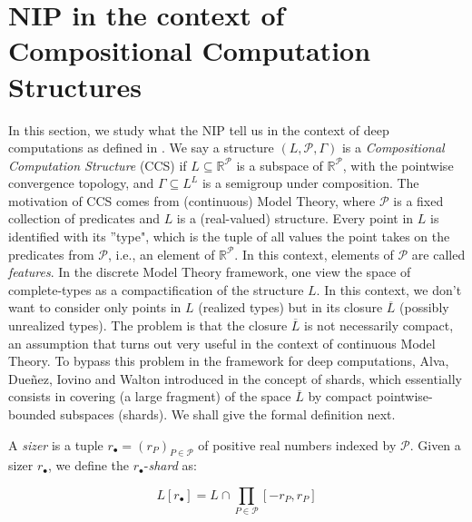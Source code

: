\documentclass[psamsfonts]{amsart}
\theoremstyle{definition}
\theoremstyle{remark}
\numberwithin{equation}{section}
\begin{document}
\section{NIP in the context of Compositional Computation Structures}

In this section, we study what the NIP tell us in the context of deep computations as defined in \cite{alva2024approximability}. We say a structure $(L,\mathcal P,\Gamma)$ is a \emph{Compositional Computation Structure} (CCS) if $L\subseteq\mathbb R^\mathcal P$ is a subspace of $\mathbb{R}^\mathcal{P}$, with the pointwise convergence topology, and $\Gamma\subseteq L^L$ is a semigroup under composition. The motivation of CCS comes from (continuous) Model Theory, where $\mathcal{P}$ is a fixed collection of predicates and $L$ is a (real-valued) structure. Every point in $L$ is identified with its ''type", which is the tuple of all values the point takes on the predicates from $\mathcal{P}$, i.e., an element of $\mathbb{R}^\mathcal{P}$. In this context, elements of $\mathcal{P}$ are called \emph{features}. In the discrete Model Theory framework, one view the space of complete-types as a compactification of the structure $L$. In this context, we don't want to consider only points in $L$ (realized types) but in its closure $\overline{L}$ (possibly unrealized types). The problem is that the closure $\overline{L}$ is not necessarily compact, an assumption that turns out very useful in the context of continuous Model Theory. To bypass this problem in the framework for deep computations, Alva, Dueñez, Iovino and Walton introduced in \cite{alva2024approximability} the concept of shards, which essentially consists in covering (a large fragment) of the space $\overline{L}$ by compact pointwise-bounded subspaces (shards). We shall give the formal definition next.

A \emph{sizer} is a tuple $r_{\bullet}=(r_P)_{P\in\mathcal{P}}$ of positive real numbers indexed by $\mathcal{P}$. Given a sizer $r_\bullet$, we define the $r_\bullet$-\emph{shard} as:

$$L[r_\bullet]=L\cap\prod_{P\in\mathcal{P}}[-r_P,r_P]$$
\end{document}
